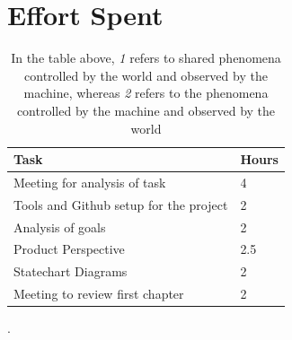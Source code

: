 \documentclass{report}
\begin{document}
\chapter{Effort Spent}
\begin{table}[!ht]
	\begin{tabular}{|C{.60\textwidth}||C{.20\textwidth}|}
		\toprule
		\textbf{Task} & \textbf{Hours}\\
		\midrule
		\midrule
		Meeting for analysis of task & 4\\
		\midrule
		Tools and Github setup for the project & 2\\
		\midrule
		Analysis of goals & 2\\
		\midrule
		Product Perspective & 2.5\\ 
		\midrule			
		Statechart Diagrams & 2\\
		\midrule
		Meeting to review first chapter & 2\\
		\bottomrule
	\end{tabular}
	\caption{In the table above, \textit{1} refers to shared phenomena controlled by the world and observed by the machine, whereas \textit{2} refers to the phenomena controlled by the machine and observed by the world}.
	\label{tab:multicol}
\end{table}
\end{document}
